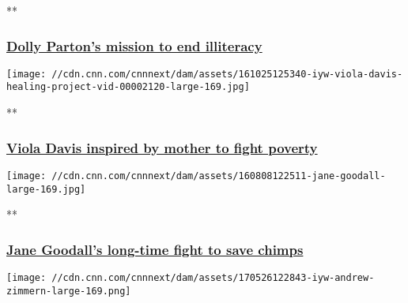 **

\hypertarget{dolly-partons-mission-to-end-illiteracy}{%
\subsubsection{\texorpdfstring{\href{/videos/tv/2016/10/28/iyw-dolly-parton-imagination-library.cnn/video/playlists/impact-your-world/}{Dolly
Parton's mission to end
illiteracy}}{Dolly Parton's mission to end illiteracy}}\label{dolly-partons-mission-to-end-illiteracy}}

\href{/videos/tv/2016/10/25/iyw-viola-davis-healing-project-vid.cnn/video/playlists/impact-your-world/}{}

\texttt{[image: //cdn.cnn.com/cnnnext/dam/assets/161025125340-iyw-viola-davis-healing-project-vid-00002120-large-169.jpg]}

**

\hypertarget{viola-davis-inspired-by-mother-to-fight-poverty}{%
\subsubsection{\texorpdfstring{\href{/videos/tv/2016/10/25/iyw-viola-davis-healing-project-vid.cnn/video/playlists/impact-your-world/}{Viola
Davis inspired by mother to fight
poverty}}{Viola Davis inspired by mother to fight poverty}}\label{viola-davis-inspired-by-mother-to-fight-poverty}}

\href{/videos/tv/2016/09/14/iyw-jane-goodall.cnn/video/playlists/impact-your-world/}{}

\texttt{[image: //cdn.cnn.com/cnnnext/dam/assets/160808122511-jane-goodall-large-169.jpg]}

**

\hypertarget{jane-goodalls-long-time-fight-to-save-chimps}{%
\subsubsection{\texorpdfstring{\href{/videos/tv/2016/09/14/iyw-jane-goodall.cnn/video/playlists/impact-your-world/}{Jane
Goodall's long-time fight to save
chimps}}{Jane Goodall's long-time fight to save chimps}}\label{jane-goodalls-long-time-fight-to-save-chimps}}

\href{/videos/tv/2017/05/26/iyw-andrew-zimmern-services-for-the-underserved.cnn/video/playlists/impact-your-world/}{}

\texttt{[image: //cdn.cnn.com/cnnnext/dam/assets/170526122843-iyw-andrew-zimmern-large-169.png]}

